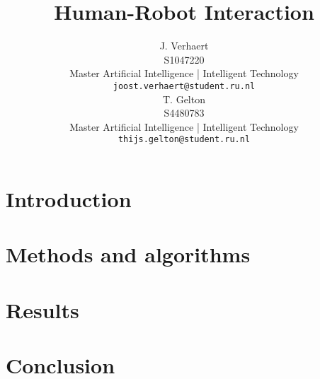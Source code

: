 \documentclass{article}
\title{Human-Robot Interaction}
\date{}
\author{
    J. Verhaert \\
    S1047220\\
    Master Artificial Intelligence | Intelligent Technology \\
    \texttt{joost.verhaert@student.ru.nl} \\
    \And
    T. Gelton \\
    S4480783\\
    Master Artificial Intelligence | Intelligent Technology \\
    \texttt{thijs.gelton@student.ru.nl} \\
}
\begin{document}
    \maketitle
    \pagebreak


    \section{Introduction}\label{sec:introduction}


    \section{Methods and algorithms}\label{sec:methods-and-algorithms}


    \section{Results}\label{sec:results}


    \section{Conclusion}\label{sec:conclusion}


    
    
\end{document}
